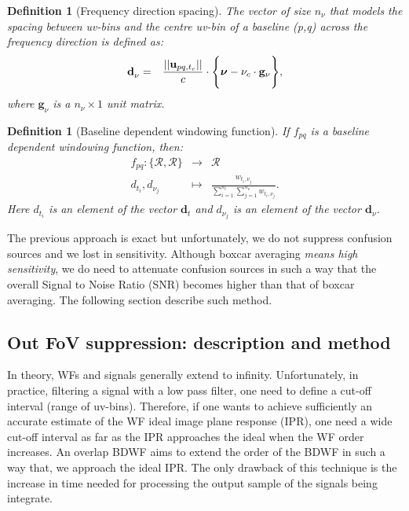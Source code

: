 \documentclass[useAMS,usenatbib]{mn2e}
\newtheorem{definition}[theorem]{Definition}
\begin{document}
\begin{definition}[Frequency direction spacing]
\label{def:2}
The vector of size $n_{\nu}$ that models the spacing between uv-bins and the centre uv-bin of a baseline (p,q) 
across the frequency direction is defined as:
\begin{eqnarray*}
\mathbf{d}^{}_{\nu} &=&\frac{||\textbf{u}_{pq,t_c}||}{c}\cdot\Bigg\{\mbox{\boldmath 
$\nu$}-\nu_c\cdot\mathbf{g}_{\nu} \Bigg \},
\end{eqnarray*}
where  $\mathbf{g}_{\nu}$ is a $n_{\nu}\times1$ unit matrix. 
\end{definition}
\begin{definition}[Baseline dependent windowing function]
\label{def:3}
If $f_{pq}$ is a \textit{baseline dependent windowing function}, then:
\begin{eqnarray*}
 f_{pq}: \{\mathbf{\mathcal{R}},\mathbf{\mathcal{R}}\} &\rightarrow& \mathbf{\mathcal{R}}\\
                   d_{t_i},d_{\nu_j} &\mapsto& \frac{w_{t_i,\nu_j}}{\sum_{i=1}^{n_t}\sum_{j=1}^{n_{\nu}}w_{t_i,\nu_j}}.
\end{eqnarray*}
Here $d_{t_i}$ is an element of the vector $\mathbf{d}_{t}$ and $d_{\nu_j}$ is an element 
of the vector $\mathbf{d}^{}_{\nu}$.
\end{definition}
The previous approach is exact but unfortunately, we do not suppress confusion sources and we lost in 
sensitivity. Although boxcar averaging \textit{means high sensitivity}, we do need to attenuate confusion sources in such a 
way that the overall Signal to Noise Ratio (SNR) becomes higher than that of boxcar averaging. The following section describe such 
method.
\subsection{Out FoV suppression: description and method}
\label{baseline2}
In theory, WFs and signals generally extend to  infinity. Unfortunately, in practice, filtering a signal with a low pass 
filter, one need to define a cut-off interval (range of uv-bins). Therefore, if one  wants to achieve sufficiently an accurate  estimate 
of the WF ideal image plane response (IPR), one need a wide cut-off interval as far as the IPR approaches 
the ideal when the WF order increases. An overlap BDWF aims to extend the order of the BDWF in 
such a way that, we approach the ideal IPR. The only drawback of this technique is the increase in time needed for processing the 
output sample of the signals being integrate.
\end{document}

